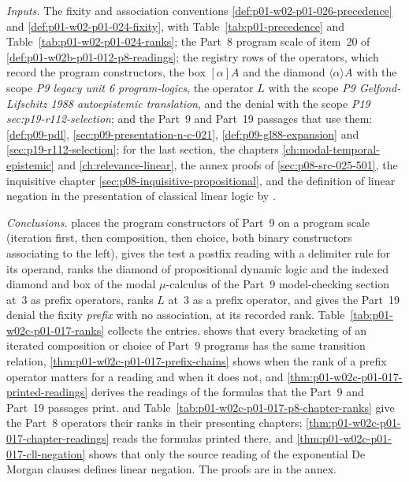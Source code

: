 \emph{Inputs.}  The fixity and association conventions
\cref{def:p01-w02-p01-026-precedence} and
\cref{def:p01-w02-p01-024-fixity}, with Table~\ref{tab:p01-precedence} and
Table~\ref{tab:p01-w02-p01-024-ranks}; the Part~8 program scale of item~20
of \cref{def:p01-w02b-p01-012-p8-readings}; the registry rows of the
operators, which record the program constructors, the box
\([\alpha]A\) and the diamond \(\langle\alpha\rangle A\) with the scope
\emph{P9 legacy unit 6 program-logics}, the
operator \(L\) with the scope \emph{P9 Gelfond-Lifschitz 1988
autoepistemic translation}, and the denial with the scope \emph{P19
sec:p19-r112-selection}; and the Part~9 and Part~19 passages that use
them: \cref{def:p09-pdl}, \cref{sec:p09-presentation-n-c-021},
\cref{def:p09-gl88-expansion} and \cref{sec:p19-r112-selection}; for
the last section, the chapters \cref{ch:modal-temporal-epistemic} and
\cref{ch:relevance-linear}, the annex proofs of
\cref{sec:p08-src-025-501}, the inquisitive chapter
\cref{sec:p08-inquisitive-propositional}, and the definition of linear
negation in the presentation of classical linear logic by
\textcite{Girard1995}.

\emph{Conclusions.}   places the
program constructors of Part~9 on a program scale (iteration first, then
composition, then choice, both binary constructors associating to the
left), gives the test a postfix reading with a delimiter rule for its
operand, ranks the diamond of propositional dynamic logic and the
indexed diamond and box of the modal \(\mu\)-calculus of the Part~9
model-checking section at~3 as prefix operators, ranks \(L\) at~3 as a
prefix operator, and gives the Part~19 denial the fixity \emph{prefix} with no association, at its recorded rank.
Table~\ref{tab:p01-w02c-p01-017-ranks} collects the entries.
 shows that every bracketing of
an iterated composition or choice of Part~9 programs has the same
transition relation, \cref{thm:p01-w02c-p01-017-prefix-chains} shows when
the rank of a prefix operator matters for a reading and when it does not,
and \cref{thm:p01-w02c-p01-017-printed-readings} derives the readings of
the formulas that the Part~9 and Part~19 passages print.
 and
Table~\ref{tab:p01-w02c-p01-017-p8-chapter-ranks} give the Part~8
operators their ranks in their presenting chapters;
\cref{thm:p01-w02c-p01-017-chapter-readings} reads the formulas printed
there, and \cref{thm:p01-w02c-p01-017-cll-negation} shows that only the
source reading of the exponential De Morgan clauses defines linear
negation.  The proofs are in the annex.

